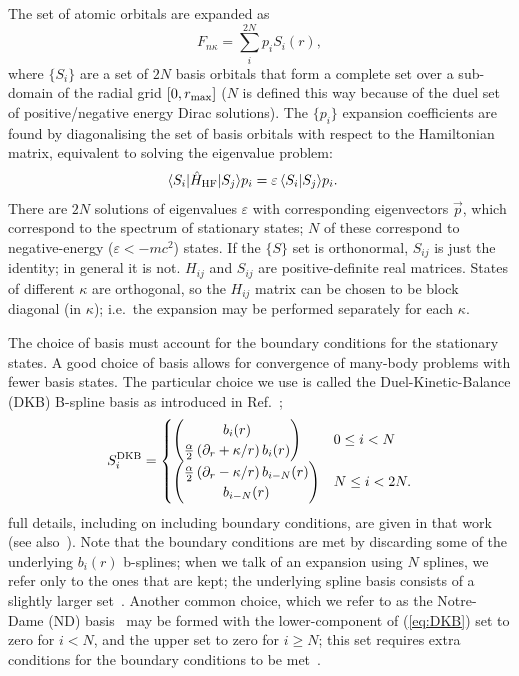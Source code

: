\documentclass[10pt,twocolumn,a4paper]{article}%
\newcommand{\bra}[1]{\ensuremath{\langle #1|}}	%
\newcommand{\ket}[1]{\ensuremath{|#1\rangle}}	%
\newcommand{\braket}[1]{\ensuremath{\langle #1\rangle}}	%
\newcommand{\twocomp}[2]{\ensuremath{\begin{pmatrix}#1\\#2\end{pmatrix}}}	%
\newcommand{\be}{\begin{equation}}
\newcommand{\ee}{\end{equation}}
\def\en{\ensuremath{\varepsilon}}
\def\p{\ensuremath{\partial}}
\renewcommand{\k}{\ensuremath{\kappa}}
\begin{document}
The set of atomic orbitals are expanded as
\be
F_{n\k} = \sum_i^{2N} p_i S_i(r),
\ee
where $\{S_i\}$ are a set of $2N$ basis orbitals that form a complete set over a sub-domain of the radial grid $[0,r_{\rm max}]$ ($N$ is defined this way because of the duel set of positive/negative energy Dirac solutions).
The $\{p_i\}$ expansion coefficients are found by diagonalising the set of basis orbitals with respect to the Hamiltonian matrix, equivalent to solving the eigenvalue problem:
\begin{align}\label{eq:Hij-splines}
\bra{S_i}\hat H_{\rm HF}\ket{S_j} p_i &= \en\,\braket{S_i|S_j} p_i.
\end{align}
There are $2N$ solutions of eigenvalues $\en$ with corresponding eigenvectors $\vec{p}$, which correspond to the spectrum of stationary states; $N$ of these correspond to negative-energy ($\en<-mc^2$) states.
If the $\{S\}$ set is orthonormal, $S_{ij}$ is just the identity; in general it is not.
$H_{ij}$ and $S_{ij}$ are positive-definite real matrices.
States of different $\k$ are orthogonal, so the $H_{ij}$ matrix can be chosen to be block diagonal (in $\k$); i.e.\ the expansion may be performed separately for each $\kappa$. 







The choice of basis must account for the boundary conditions for the stationary states.
A good choice of basis allows for convergence of many-body problems with fewer basis states.
The particular choice we use is called the Duel-Kinetic-Balance (DKB) B-spline basis as introduced in Ref.~\cite{Beloy2008};
\be\label{eq:DKB}
S_i^{\rm DKB}= \begin{cases}
\twocomp{b_i(r)}{\frac{\alpha}{2}\left(\p_r+\kappa/r\right)b_i(r)}  &  0\leq i<N \\
\twocomp{\frac{\alpha}{2}\left(\p_r-\kappa/r\right)b_{i-N}(r)}{b_{i-N}(r)}   & N\leq i<2N.
\end{cases}
\ee
full details, including on including boundary conditions, 
are given in that work (see also~\cite{Johnson1988,AMBiT2018}).
Note that the boundary conditions are met by discarding some of the underlying $b_i(r)$ b-splines; when we talk of an expansion using $N$ splines, we refer only to the ones that are kept; the underlying spline basis consists of a slightly larger set~\cite{Beloy2008}.
Another common choice, which we refer to as the Notre-Dame (ND) basis~\cite{Johnson1988} may be formed with the lower-component of (\ref{eq:DKB}) set to zero for $i<N$, and the upper set to zero for $i\geq N$; this set requires extra conditions for the boundary conditions to be met~\cite{Johnson1988}.
\end{document}
